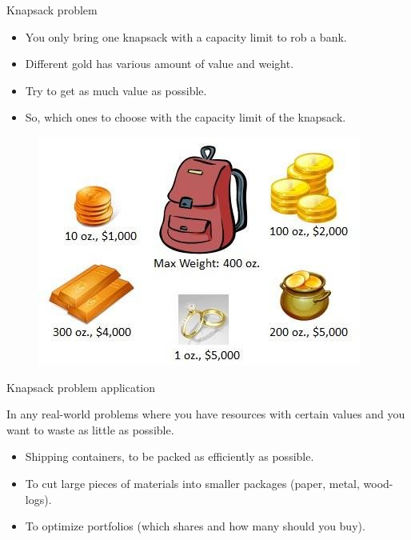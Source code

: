 \documentclass[xcolor=dvipsnames,aspectratio=169]{beamer}
\begin{document}
\begin{frame}{Knapsack problem}
\begin{itemize}
    \item You only bring one knapsack with a capacity 
    limit to rob a bank. 
    \item Different gold has various amount of 
    value and weight.
    \item Try to get as much value as possible.
    \item So, which ones to choose with the capacity limit of the 
    knapsack. 
\end{itemize}

\begin{figure}
\centering

\vspace*{-0.5cm}
\includegraphics[scale=0.6]{knapsack-problem.png}

\end{figure}
\end{frame}

\begin{frame}{Knapsack problem application}
    
In any real-world problems where you have resources with certain 
values and you want to waste as little as possible.
    \begin{itemize}
        \item Shipping containers, to be packed as efficiently as possible.
        \item To cut large  pieces of materials into smaller packages (paper, metal, wood-logs).
        \item To optimize portfolios (which shares and how 
        many should you buy).

    \end{itemize}

\end{frame}
\end{document}
